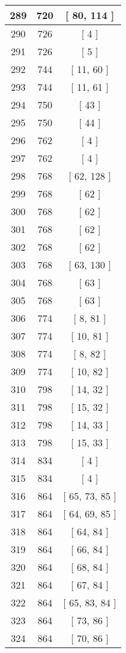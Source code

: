 \begin{center}
\begin{longtable}[H]{|| c c c ||}
\hline
289 & 720 & [ 80, 114 ] \\ 
\hline
290 & 726 & [ 4 ] \\ 
\hline
291 & 726 & [ 5 ] \\ 
\hline
292 & 744 & [ 11, 60 ] \\ 
\hline
293 & 744 & [ 11, 61 ] \\ 
\hline
294 & 750 & [ 43 ] \\ 
\hline
295 & 750 & [ 44 ] \\ 
\hline
296 & 762 & [ 4 ] \\ 
\hline
297 & 762 & [ 4 ] \\ 
\hline
298 & 768 & [ 62, 128 ] \\ 
\hline
299 & 768 & [ 62 ] \\ 
\hline
300 & 768 & [ 62 ] \\ 
\hline
301 & 768 & [ 62 ] \\ 
\hline
302 & 768 & [ 62 ] \\ 
\hline
303 & 768 & [ 63, 130 ] \\ 
\hline
304 & 768 & [ 63 ] \\ 
\hline
305 & 768 & [ 63 ] \\ 
\hline
306 & 774 & [ 8, 81 ] \\ 
\hline
307 & 774 & [ 10, 81 ] \\ 
\hline
308 & 774 & [ 8, 82 ] \\ 
\hline
309 & 774 & [ 10, 82 ] \\ 
\hline
310 & 798 & [ 14, 32 ] \\ 
\hline
311 & 798 & [ 15, 32 ] \\ 
\hline
312 & 798 & [ 14, 33 ] \\ 
\hline
313 & 798 & [ 15, 33 ] \\ 
\hline
314 & 834 & [ 4 ] \\ 
\hline
315 & 834 & [ 4 ] \\ 
\hline
316 & 864 & [ 65, 73, 85 ] \\ 
\hline
317 & 864 & [ 64, 69, 85 ] \\ 
\hline
318 & 864 & [ 64, 84 ] \\ 
\hline
319 & 864 & [ 66, 84 ] \\ 
\hline
320 & 864 & [ 68, 84 ] \\ 
\hline
321 & 864 & [ 67, 84 ] \\ 
\hline
322 & 864 & [ 65, 83, 84 ] \\ 
\hline
323 & 864 & [ 73, 86 ] \\ 
\hline
324 & 864 & [ 70, 86 ] \\ 

\end{longtable}
\end{center}
